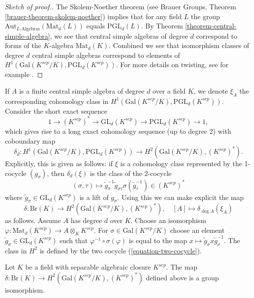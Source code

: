 \begin{proof}[Sketch of proof.]
The Skolem-Noether theorem (see
Brauer Groups, Theorem \ref{brauer-theorem-skolem-noether})
implies that for any field $L$ the group
$\text{Aut}_{L\text{-Algebras}}(\text{Mat}_d(L))$
equals $\text{PGL}_d(L)$. By
Theorem \ref{theorem-central-simple-algebra}, we see that
central simple algebras of degree $d$ correspond
to forms of the $K$-algebra $\text{Mat}_d(K)$.
Combined we see that isomorphism classes of degree $d$ central
simple algebras correspond to elements of
$H^1(\text{Gal}(K^{sep}/K), \text{PGL}_d(K^{sep}))$.
For more details on twisting, see for example
\cite{SilvermanEllipticCurves}.
\end{proof}

\noindent
If $A$ is a finite central simple algebra of degree $d$ over a field $K$,
we denote $\xi_A$ the corresponding cohomology class in
$H^1(\text{Gal}(K^{sep}/K), \text{PGL}_d(K^{sep}))$.
Consider the short exact sequence
$$
1 \to (K^{sep})^* \to \text{GL}_d(K^{sep}) \to \text{PGL}_d(K^{sep}) \to 1,
$$
which gives rise to a long exact cohomology sequence (up to degree 2) with
coboundary map
$$
\delta_d :
H ^1(\text{Gal}(K^{sep}/K), \text{PGL}_d(K^{sep}))
\longrightarrow
H^2(\text{Gal}(K^{sep}/K), (K^{sep})^*).
$$
Explicitly, this is given as follows: if $\xi$ is a cohomology class
represented by the 1-cocycle $(g_\sigma)$, then $\delta_d(\xi)$ is the
class of the 2-cocycle
\begin{equation}
\label{equation-two-cocycle}
(\sigma, \tau)
\longmapsto
\tilde g_\sigma^{-1} \tilde g_{\sigma \tau} \sigma(\tilde g_\tau^{-1})
\in (K^{sep})^*
\end{equation}
where $\tilde g_\sigma \in \text{GL}_d(K^{sep})$ is a lift of $g_\sigma$.
Using this we can make explicit the map
$$
\delta : \text{Br}(K) \longrightarrow H^2(\text{Gal}(K^{sep}/K), (K^{sep})^*),
\quad
[A] \longmapsto \delta_{\deg A} (\xi_A)
$$
as follows. Assume $A$ has degree $d$ over $K$. Choose an isomorphism
$\varphi : \text{Mat}_d(K^{sep}) \to A \otimes_K K^{sep}$. For
$\sigma \in \text{Gal}(K^{sep}/K)$ choose an element
$\tilde g_\sigma \in \text{GL}_d(K^{sep})$ such that
$\varphi^{-1} \circ \sigma(\varphi)$ is equal to the map
$x \mapsto \tilde g_\sigma x \tilde g_\sigma^{-1}$. The class in $H^2$
is defined by the two cocycle (\ref{equation-two-cocycle}).

\begin{theorem}
\label{theorem-brauer-delta}
Let $K$ be a field with separable algebraic closure $K^{sep}$. The map
$\delta : \text{Br}(K) \to H^2(\text{Gal}(K^{sep}/K), (K^{sep})^*)$
defined above is a group isomorphism.
\end{theorem}

